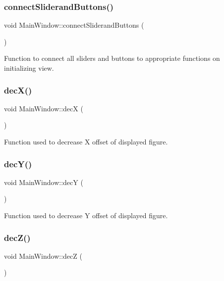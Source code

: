 \subsubsection{\texorpdfstring{connect\+Sliderand\+Buttons()}{connectSliderandButtons()}}
{\footnotesize\ttfamily void Main\+Window\+::connect\+Sliderand\+Buttons (\begin{DoxyParamCaption}{ }\end{DoxyParamCaption})}



Function to connect all sliders and buttons to appropriate functions on initializing view. 

\mbox{\label{classMainWindow_a4c4ad4dbc9064c0bdbdb5f9ba619a6c2}} 
\subsubsection{\texorpdfstring{dec\+X()}{decX()}}
{\footnotesize\ttfamily void Main\+Window\+::decX (\begin{DoxyParamCaption}{ }\end{DoxyParamCaption})}



Function used to decrease X offset of displayed figure. 

\mbox{\label{classMainWindow_aeab655f19703fca45999fc3cb11b6bd0}} 
\subsubsection{\texorpdfstring{dec\+Y()}{decY()}}
{\footnotesize\ttfamily void Main\+Window\+::decY (\begin{DoxyParamCaption}{ }\end{DoxyParamCaption})}



Function used to decrease Y offset of displayed figure. 

\mbox{\label{classMainWindow_a5841a993bb0167306794580058c435e2}} 
\subsubsection{\texorpdfstring{dec\+Z()}{decZ()}}
{\footnotesize\ttfamily void Main\+Window\+::decZ (\begin{DoxyParamCaption}{ }\end{DoxyParamCaption})}



